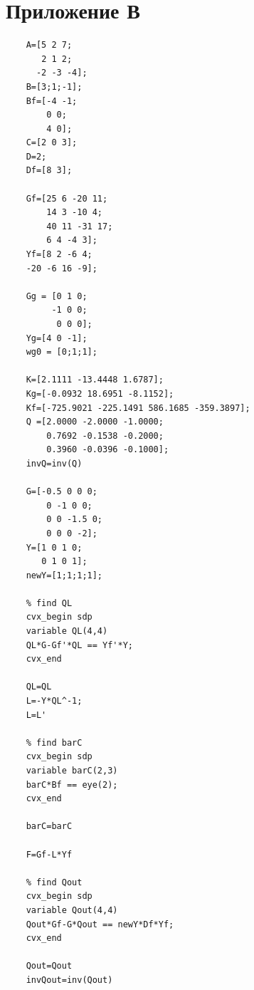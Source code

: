 \documentclass[a4paper, 12pt]{article}
\begin{document}
    \section{Приложение В}
    \begin{lstlisting}[label=task3,caption={Программа для задания 3}]
    % plant parameters
    A=[5 2 7;
       2 1 2;
      -2 -3 -4];
    B=[3;1;-1];
    Bf=[-4 -1;
        0 0;
        4 0];
    C=[2 0 3];
    D=2;
    Df=[8 3];

    Gf=[25 6 -20 11;
        14 3 -10 4;
        40 11 -31 17;
        6 4 -4 3];
    Yf=[8 2 -6 4;
    -20 -6 16 -9];

    Gg = [0 1 0;
         -1 0 0;
          0 0 0];
    Yg=[4 0 -1];
    wg0 = [0;1;1];

    K=[2.1111 -13.4448 1.6787];
    Kg=[-0.0932 18.6951 -8.1152];
    Kf=[-725.9021 -225.1491 586.1685 -359.3897];
    Q =[2.0000 -2.0000 -1.0000;
        0.7692 -0.1538 -0.2000;
        0.3960 -0.0396 -0.1000];
    invQ=inv(Q)

    G=[-0.5 0 0 0;
        0 -1 0 0;
        0 0 -1.5 0;
        0 0 0 -2];
    Y=[1 0 1 0;
       0 1 0 1];
    newY=[1;1;1;1];

    % find QL
    cvx_begin sdp
    variable QL(4,4)
    QL*G-Gf'*QL == Yf'*Y;
    cvx_end

    QL=QL
    L=-Y*QL^-1;
    L=L'

    % find barC
    cvx_begin sdp
    variable barC(2,3)
    barC*Bf == eye(2);
    cvx_end

    barC=barC

    F=Gf-L*Yf

    % find Qout
    cvx_begin sdp
    variable Qout(4,4)
    Qout*Gf-G*Qout == newY*Df*Yf;
    cvx_end

    Qout=Qout
    invQout=inv(Qout)
    \end{lstlisting}
\end{document}
